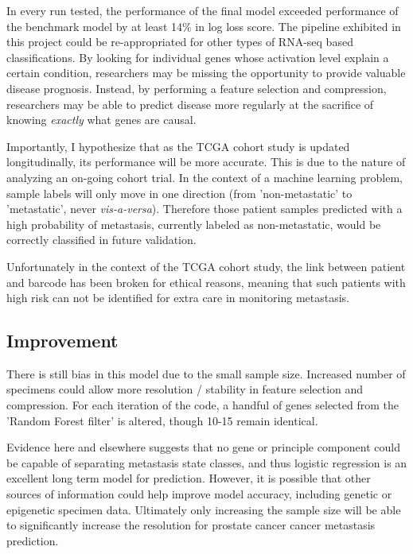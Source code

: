 \documentclass[final]{article}
\begin{document}
In every run tested, the performance of the final model exceeded performance of
the benchmark model by at least 14\% in log loss score.  The pipeline exhibited
in this project could be re-appropriated for other types of RNA-seq based
classifications.  By looking for individual genes whose activation level explain
a certain condition, researchers may be missing the opportunity to provide
valuable disease prognosis.  Instead, by performing a feature selection and
compression, researchers may be able to predict disease more regularly at the
sacrifice of knowing \textit{exactly} what genes are causal.

Importantly, I hypothesize that as the TCGA cohort study is updated
longitudinally, its performance will be more accurate.  This is due to the
nature  of analyzing an on-going cohort trial.  In the context of a machine
learning problem,  sample labels will only move in one direction (from
'non-metastatic' to 'metastatic', never \textit{vis-a-versa}).  Therefore those patient
samples predicted with a high  probability of metastasis, currently labeled as
non-metastatic, would be correctly classified in future validation.

Unfortunately in the context of the TCGA cohort study, the link between patient
and barcode has been broken for ethical reasons, meaning that such patients with
high risk  can not be identified for extra care in monitoring metastasis.


\subsection{Improvement}

There is still bias in this model due to the small sample size.  Increased
number of specimens could allow more resolution / stability in feature selection
and  compression.  For each iteration of the code, a handful of genes selected
from the 'Random Forest filter' is altered, though 10-15 remain identical.

Evidence here and elsewhere suggests that no gene or principle component could
be capable of separating  metastasis state classes, and thus logistic regression
is an excellent long term  model for prediction.  However, it is possible that
other sources of information  could help improve model accuracy, including
genetic or epigenetic specimen data.  Ultimately only increasing the sample size
will be able to significantly increase the resolution for prostate cancer cancer metastasis
prediction.
\end{document}
